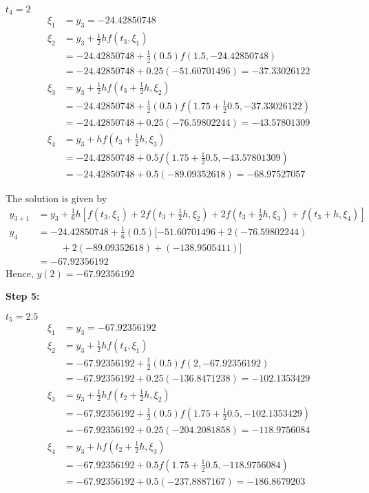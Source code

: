 \documentclass[12pt,a4paper]{article}
\begin{document}
$ t_4 = 2 $
\begin{align*}
\xi_1 &= y_3 = -24.42850748 \\
\xi_2 &= y_3 + \frac{1}{2}hf(t_3,\xi_1) \\
&= -24.42850748 + \frac{1}{2}(0.5)f(1.5,-24.42850748)\\
&= -24.42850748 + 0.25(-51.60701496) = -37.33026122 \\
\xi_3 &= y_3 + \frac{1}{2}hf\left( t_3 + \frac{1}{2}h, \xi_2 \right)  \\
&= -24.42850748 + \frac{1}{2}(0.5)f\left( 1.75 + \frac{1}{2}0.5, -37.33026122 \right)  \\
&= -24.42850748 + 0.25(-76.59802244) = -43.57801309  \\
\xi_4 &= y_3 + hf\left( t_3 + \frac{1}{2}h, \xi_3\right) \\
&= -24.42850748 + 0.5f\left( 1.75 + \frac{1}{2}0.5, -43.57801309\right) \\
&= -24.42850748 + 0.5(-89.09352618) = -68.97527057
\end{align*}

The solution is given by 
\begin{align*}
y_{3+1} &= y_3 + \frac{1}{6}h\left[ f(t_3 , \xi_1 ) + 2f(t_3 + \frac{1}{2} h , \xi_2) + 2f(t_3 + \frac{1}{2} h , \xi_3 ) + f(t_3 + h , \xi_4) \right] \\
y_4 &= -24.42850748 + \frac{1}{6}(0.5)[ -51.60701496 + 2(-76.59802244) \\
&\hspace{1cm} + 2( -89.09352618 ) + (-138.9505411)] \\
&= -67.92356192
\end{align*}
Hence, \quad $y(2) = -67.92356192 $

\noindent
\textbf{Step 5:}

$ t_5 = 2.5 $
\begin{align*}
\xi_1 &= y_3 = -67.92356192 \\
\xi_2 &= y_3 + \frac{1}{2}hf(t_4,\xi_1) \\
&= -67.92356192 + \frac{1}{2}(0.5)f(2,-67.92356192)\\
&= -67.92356192 + 0.25(-136.8471238) = -102.1353429 \\
\xi_3 &= y_3 + \frac{1}{2}hf\left( t_2 + \frac{1}{2}h, \xi_2 \right)  \\
&= -67.92356192 + \frac{1}{2}(0.5)f\left( 1.75 + \frac{1}{2}0.5, -102.1353429 \right)  \\
&= -67.92356192 + 0.25(-204.2081858) = -118.9756084  \\
\xi_4 &= y_3 + hf\left( t_2 + \frac{1}{2}h, \xi_3\right) \\
&= -67.92356192 + 0.5f\left( 1.75 + \frac{1}{2}0.5, -118.9756084\right) \\
&= -67.92356192 + 0.5(-237.8887167) = -186.8679203
\end{align*}
\end{document}
